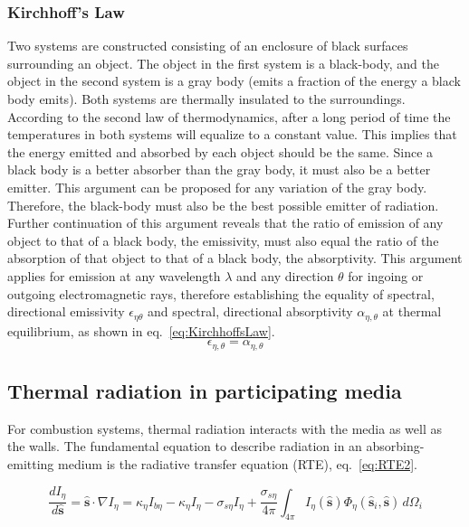 \subsubsection{Kirchhoff's Law} \label{sec:KirchoffsLaw}
Two systems are constructed consisting of an enclosure of black surfaces surrounding an object. The object in the first system is a black-body, and the object in the second system is a gray body (emits a fraction of the energy a black body emits). Both systems are thermally insulated to the surroundings. 
According to the second law of thermodynamics, after a long period of time the temperatures in both systems will equalize to a constant value. This implies that the energy emitted and absorbed by each object should be the same.
Since a black body is a better absorber than the gray body, it must also be a better emitter. This argument can be proposed for any variation of the gray body. Therefore, the black-body must also be the best possible emitter of radiation.
Further continuation of this argument reveals that the ratio of emission of any object to that of a black body, the emissivity, must also equal the ratio of the absorption of that object to that of a black body, the absorptivity. This argument applies for emission at any wavelength $\lambda$ and any direction $\theta$ for ingoing or outgoing electromagnetic rays, therefore establishing the equality of spectral, directional emissivity $\epsilon_{\eta{}\theta{}}$ and spectral, directional absorptivity $\alpha{}_{\eta,\theta}$ at thermal equilibrium, as shown in eq.~\ref{eq:KirchhoffsLaw}.
\begin{equation}
    \epsilon{}_{\eta{},\theta{}}=\alpha{}_{\eta{},\theta{}}
    \label{eq:KirchhoffsLaw}
\end{equation}


\subsection{Thermal radiation in participating media} \label{section:RTE}
For combustion systems, thermal radiation interacts with the media as well as the walls. The fundamental equation to describe radiation in an absorbing-emitting medium is the radiative transfer equation (RTE), eq.~\ref{eq:RTE2}.

\begin{equation}
    \frac{dI_\eta{}}{d\hat{\textbf{s}}} = \hat{\textbf{s}} \cdot \nabla{I_\eta{}} = \kappa{}_\eta{}I_{b\eta{}}-\kappa{}_\eta{}I_\eta{}-\sigma{}_{s\eta{}}I_\eta{}+\frac{\sigma{}_{s\eta{}}}{4\pi}\int_{4\pi{}}{I_\eta{}(\hat{\textbf{s}})\Phi_\eta{}(\hat{\textbf{s}}_i,\hat{\textbf{s}})}\,d\Omega{}_i
    \label{eq:RTE2}
\end{equation}

